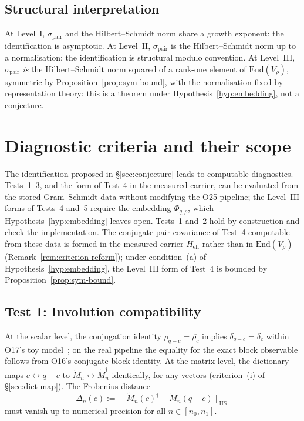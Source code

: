 \documentclass[12pt,a4paper]{article}
\theoremstyle{definition}
\theoremstyle{remark}
\begin{document}
  \subsection{Structural interpretation}
    \label{sec:interpretation}

    At Level~I, $\sigma_{\mathrm{pair}}$ and the Hilbert--Schmidt norm share a growth
    exponent: the identification is asymptotic.
    At Level~II, $\sigma_{\mathrm{pair}}$ is the Hilbert--Schmidt norm up to a
    normalisation: the identification is structural modulo convention.
    At Level~III, $\sigma_{\mathrm{pair}}$ \emph{is} the Hilbert--Schmidt norm squared
    of a rank-one element of $\mathrm{End}(V_\rho)$, symmetric by
    Proposition~\ref{prop:sym-bound}, with the normalisation fixed by
    representation theory: this is a theorem under Hypothesis~\ref{hyp:embedding},
    not a conjecture.

  \section{Diagnostic criteria and their scope}
  \label{sec:tests}

  The identification proposed in §\ref{sec:conjecture} leads to computable diagnostics.
  Tests~1--3, and the form of Test~4 in the measured carrier, can be evaluated from the stored
  Gram--Schmidt data without modifying the O25 pipeline; the Level~III forms of Tests~4 and~5 require
  the embedding $\Phi_{q,\rho}$, which Hypothesis~\ref{hyp:embedding} leaves open.
  Tests~1 and~2 hold by construction and check the implementation.
  The conjugate-pair covariance of Test~4 computable from these data is formed in the measured
  carrier $H_{\mathrm{eff}}$ rather than in $\mathrm{End}(V_\rho)$
  (Remark~\ref{rem:criterion-reform}); under condition~(a) of Hypothesis~\ref{hyp:embedding}, the
  Level~III form of Test~4 is bounded by Proposition~\ref{prop:sym-bound}.

  \subsection{Test 1: Involution compatibility}
    \label{sec:test1}

    At the scalar level, the conjugation identity $\rho_{q-c} = \overline{\rho_c}$
    implies $\delta_{q-c} = \delta_c$ within O17's toy model~\cite{Beau2026a21}; on the real
    pipeline the equality for the exact block observable follows from O16's conjugate-block identity.
    At the matrix level, the dictionary maps $c \leftrightarrow q-c$ to
    $\widetilde{M}_n \leftrightarrow \widetilde{M}_n^\dagger$ identically, for any vectors
    (criterion~(i) of §\ref{sec:dict-map}).
    The Frobenius distance
    \begin{equation}
      \Delta_n(c) := \bigl\|\widetilde{M}_n(c)^\dagger
      - \widetilde{M}_n(q-c)\bigr\|_{\mathrm{HS}}
      \label{eq:test1}
    \end{equation}
    must vanish up to numerical precision for all $n \in [n_0, n_1]$.
\end{document}

